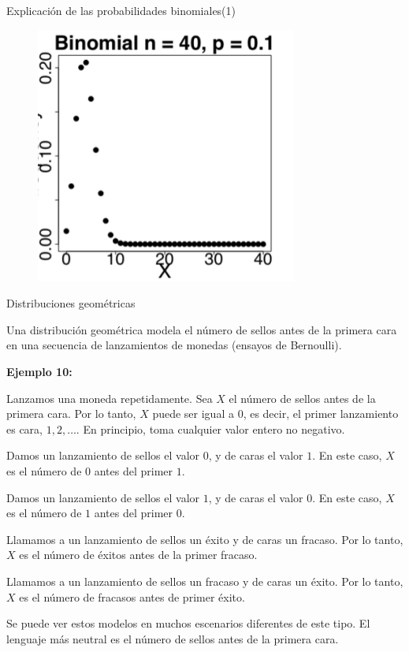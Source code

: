 \documentclass[10pt]{beamer}
\begin{document}
\begin{frame}{Explicaci\'on de las probabilidades binomiales(1)}
\begin{figure}
\begin{minipage}{.3\textwidth}
		\includegraphics[width=0.8\linewidth]{v15}
	\end{minipage}
\end{figure}
\end{frame}
\begin{frame}{Distribuciones geom\'etricas}
\small{Una distribuci\'on geom\'etrica modela el n\'umero de sellos antes de la primera cara en una secuencia de lanzamientos  de  monedas (ensayos de Bernoulli).
	
\vspace{0.2cm}

\textbf{Ejemplo 10:}
\begin{itemize}
\item \scriptsize{Lanzamos una moneda repetidamente. Sea $X$ el n\'umero de sellos antes de la primera cara. Por lo tanto, $X$ puede ser igual a $0$, es decir, el primer lanzamiento es cara, $1, 2, \dots$. En principio, toma cualquier valor entero no negativo.

\item Damos un lanzamiento de sellos el valor $0$, y de caras  el valor $1$. En este caso, $X$ es el n\'umero de $0$ antes del primer $1$.

\item Damos un lanzamiento de sellos el valor $1$, y de caras  el valor $0$. En este caso, $X$ es el n\'umero de $1$ antes del primer $0$.

\item Llamamos  a un lanzamiento  de sellos un \'exito y de caras un fracaso. Por lo tanto, $X$ es el n\'umero de \'exitos antes de la primer fracaso.

\item Llamamos  a un lanzamiento  de sellos un fracaso y de caras un \'exito. Por lo tanto, $X$ es el n\'umero de fracasos antes de primer \'exito.}
\end{itemize}

\vspace{0.2cm}

\small{Se puede ver estos modelos en muchos escenarios diferentes de este tipo. El lenguaje m\'as neutral es el n\'umero de sellos antes de la primera cara.}
	
}
\end{frame}
\end{document}
